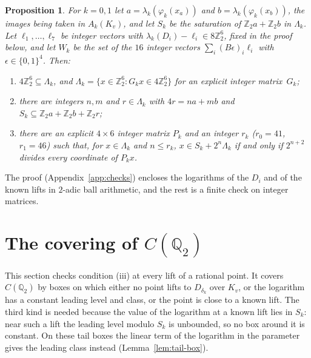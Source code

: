\documentclass[11pt]{amsart}
\newtheorem{proposition}[theorem]{Proposition}
\theoremstyle{definition}
\numberwithin{equation}{section}
\newcommand{\Qt}{\mathbb{Q}_2}
\newcommand{\Zt}{\mathbb{Z}_2}
\newcommand{\kv}{K_v}
\newcommand{\lean}[1]{\ignorespaces}
\begin{document}
\begin{proposition}\label{prop:lattice}\lean{FurioLombardo.M4.qchar_of_cert, FurioLombardo.M4.four_dvd_imv_of_mem, FurioLombardo.Discharge.M3a.quarter_of_cert, FurioLombardo.M4.T0.checks, FurioLombardo.M4.T1.checks, FurioLombardo.Discharge.M4Box.hLam_k, FurioLombardo.Discharge.M4Box.DCertData.hBD_0, FurioLombardo.Discharge.M4Box.DCertData.hBD_1, FurioLombardo.Discharge.M4Box.PhiCertData.hBP_0, FurioLombardo.Discharge.M4Box.PhiCertData.hBP_1, FurioLombardo.Discharge.Analytic.isSatOf_satOf}
For $k=0,1$ let $a=\lambda_k(\varphi_k(x_a))$ and $b=\lambda_k(\varphi_k(x_b))$, the images being taken in $A_k(\kv)$, and let $S_k$ be the saturation of $\Zt a+\Zt b$ in $\Lambda_k$. Let $\ell_1,\dots,\ell_7$ be integer vectors with $\lambda_k(D_i)-\ell_i\in8\Zt^6$, fixed in the proof below, and let $W_k$ be the set of the $16$ integer vectors $\sum_i(B\epsilon)_i\ell_i$ with $\epsilon\in\{0,1\}^4$. Then:
\begin{enumerate}
\item $4\Zt^6\subseteq\Lambda_k$, and $\Lambda_k=\{x\in\Zt^6:G_kx\in4\Zt^6\}$ for an explicit integer matrix~$G_k$;
\item there are integers $n,m$ and $r\in\Lambda_k$ with $4r=na+mb$ and $S_k\subseteq\Zt a+\Zt b+\Zt r$;
\item there are an explicit $4\times6$ integer matrix $P_k$ and an integer $r_k$ ($r_0=41$, $r_1=46$) such that, for $x\in\Lambda_k$ and $n\le r_k$, $x\in S_k+2^n\Lambda_k$ if and only if $2^{n+2}$ divides every coordinate of $P_kx$.
\end{enumerate}
\end{proposition}

The proof (Appendix~\ref{app:checks}) encloses the logarithms of the $D_i$ and of the known lifts in $2$-adic ball arithmetic, and the rest is a finite check on integer matrices.

\section{The covering of \texorpdfstring{$C(\Qt)$}{C(Q2)}}\label{sec:cover}

This section checks condition (iii) at every lift of a rational point. It covers $C(\Qt)$ by boxes on which either no point lifts to $D_{\delta_k}$ over $\kv$, or the logarithm has a constant leading level and class, or the point is close to a known lift. The third kind is needed because the value of the logarithm at a known lift lies in $S_k$: near such a lift the leading level modulo $S_k$ is unbounded, so no box around it is constant. On these tail boxes the linear term of the logarithm in the parameter gives the leading class instead (Lemma~\ref{lem:tail-box}).
\end{document}
